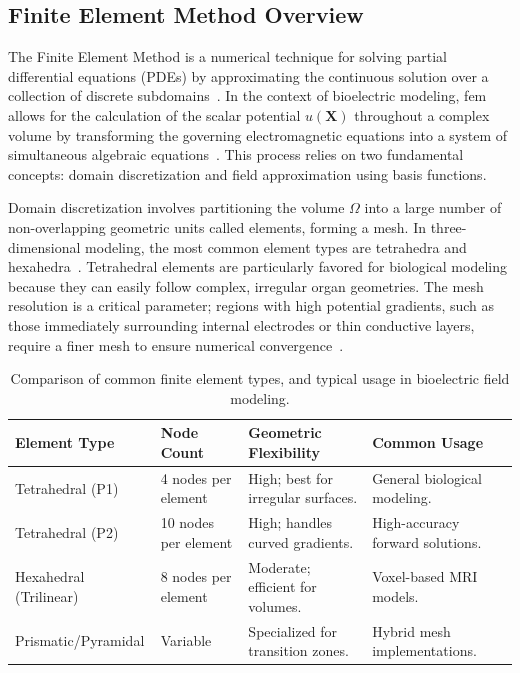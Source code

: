 \subsection{Finite Element Method Overview}
The Finite Element Method is a numerical technique for solving partial differential equations (PDEs) by approximating the continuous solution over a collection of discrete subdomains~\cite{cae-2025}. In the context of bioelectric modeling, \gls{fem} allows for the calculation of the scalar potential $u(\mathbf{X})$ throughout a complex volume by transforming the governing electromagnetic equations into a system of simultaneous algebraic equations~\cite{hallez-2007}. This process relies on two fundamental concepts: domain discretization and field approximation using basis functions.

Domain discretization involves partitioning the volume $\Omega$ into a large number of non-overlapping geometric units called elements, forming a mesh. In three-dimensional modeling, the most common element types are tetrahedra and hexahedra~\cite{fem-org}. Tetrahedral elements are particularly favored for biological modeling because they can easily follow complex, irregular organ geometries. The mesh resolution is a critical parameter; regions with high potential gradients, such as those immediately surrounding internal electrodes or thin conductive layers, require a finer mesh to ensure numerical convergence~\cite{hallez-2007}.

\begin{table}[htbp]
\centering
\caption[Finite element types and characteristics]{Comparison of common finite element types, and typical usage in bioelectric field modeling.}
\label{tab:fem_element_types}
\small
\begin{tabularx}{\textwidth}{l X X X}
\toprule
\textbf{Element Type}  
& \textbf{Node Count}                      
& \textbf{Geometric Flexibility}                     
& \textbf{Common Usage} \\
\midrule
Tetrahedral (P1)       
& 4 nodes per element                              
& High; best for irregular surfaces.                 
& General biological modeling. \\
Tetrahedral (P2)       
& 10 nodes per element                             
& High; handles curved gradients.                    
& High-accuracy forward solutions. \\
Hexahedral (Trilinear) 
& 8 nodes per element                              
& Moderate; efficient for volumes.                   
& Voxel-based MRI models. \\
Prismatic/Pyramidal    
& Variable                                         
& Specialized for transition zones.                  
& Hybrid mesh implementations. \\
\bottomrule
\end{tabularx}
\end{table}


